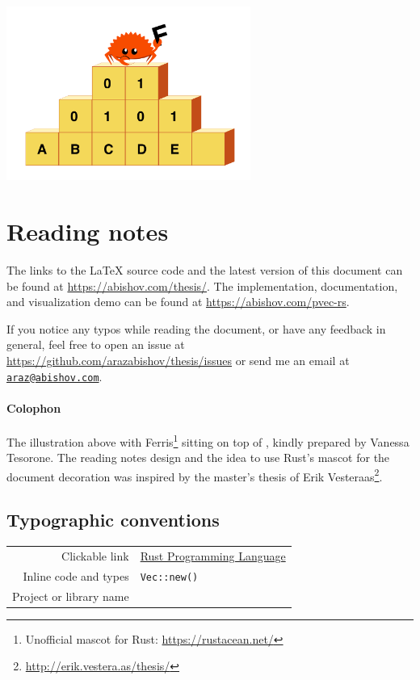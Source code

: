 \thispagestyle{plain}

\begin{center}
    \includegraphics[width=8cm, angle=0, trim=10 10 10 10, clip]{images/ferris-climbing.png}


    \section*{Reading notes}
    \begin{justify}
        The links to the LaTeX source code and the latest version of this document can be found at \url{https://abishov.com/thesis/}. The implementation, documentation, and visualization demo can be found at \url{https://abishov.com/pvec-rs}.

        If you notice any typos while reading the document, or have any feedback in general, feel free to open an issue at \url{https://github.com/arazabishov/thesis/issues} or send me an email at \href{mailto:araz@abishov.com}{\nolinkurl{araz@abishov.com}}.

        \paragraph{Colophon}
        The illustration above with Ferris\footnote{Unofficial mascot for Rust: \url{https://rustacean.net/}} sitting on top of \treerrb{}, kindly prepared by Vanessa Tesorone. The reading notes design and the idea to use Rust's mascot for the document decoration was inspired by the master's thesis of Erik Vesteraas\footnote{\url{http://erik.vestera.as/thesis/}}.
    \end{justify}

    \subsection*{Typographic conventions}
    \begin{tabular}{ r l }
        Clickable link & \href{https://www.rust-lang.org/}{Rust Programming Language} \\
        Inline code and types & \texttt{Vec::new()} \\
        Project or library name & \pvecrs{} \\
    \end{tabular}

\end{center}
